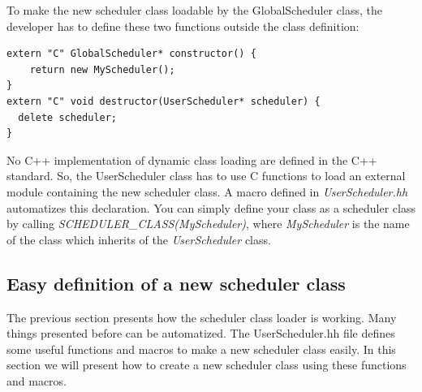 To make the new scheduler class loadable by the GlobalScheduler class, the
developer has to define these two functions outside the class definition:
\begin{verbatim}
extern "C" GlobalScheduler* constructor() {
    return new MyScheduler();
}
extern "C" void destructor(UserScheduler* scheduler) {
  delete scheduler;
}
\end{verbatim}
No C++ implementation of dynamic class loading are defined in the C++ standard.
So, the UserScheduler class has to use C functions to load an external module
containing the new scheduler class. A macro defined in \textit{UserScheduler.hh}
automatizes this declaration. You can simply define your class as a scheduler
class by calling \textit{SCHEDULER\_CLASS(MyScheduler)}, where
\textit{MyScheduler} is the name of the class which inherits of
the \textit{UserScheduler} class.

\subsection{Easy definition of a new scheduler class}
The previous section presents how the scheduler class loader is working. Many
things presented before can be automatized. The UserScheduler.hh file defines
some useful functions and macros to make a new scheduler class easily. In this
section we will present how to create a new scheduler class using these
functions and macros.

